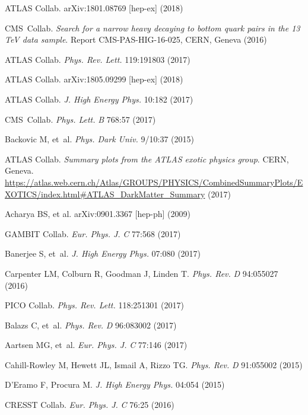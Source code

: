 \documentclass{ar-1col}
\begin{document}
{\begin{thebibliography}{175}
{ATLAS Collab}. arXiv:1801.08769 [hep-ex] (2018)

{CMS~Collab}. \textit{Search for a narrow heavy decaying to bottom quark pairs in the 13 TeV data sample}.
Report {CMS-PAS-HIG-16-025}, CERN, Geneva (2016)

{ATLAS Collab}. \textit{Phys. Rev. Lett.} 119:191803 (2017)

{ATLAS Collab.} arXiv:1805.09299 [hep-ex] (2018)

{ATLAS Collab}. \textit{J. High Energy Phys.} 10:182 (2017)

{CMS~Collab}. \textit{Phys. Lett.} \textit{B} 768:57 (2017)

Backovic M, et~al. \textit{Phys. Dark Univ.} 9/10:37 (2015)

ATLAS Collab. \textit{Summary plots from the ATLAS exotic
physics group}. CERN, Geneva. \url{https://atlas.web.cern.ch/Atlas/GROUPS/PHYSICS/CombinedSummaryPlots/EXOTICS/index.html#ATLAS_DarkMatter_Summary} (2017)

  Acharya BS, et al. arXiv:0901.3367 [hep-ph] (2009)

GAMBIT Collab. \textit{Eur. Phys. J.} \textit{C} 77:568 (2017)

Banerjee S, et~al. \textit{J. High Energy Phys.} 07:080 (2017)

Carpenter LM, Colburn R, Goodman J, Linden T. \textit{Phys. Rev.}
\textit{D} 94:055027 (2016)

PICO Collab. \textit{Phys. Rev. Lett.} 118:251301 (2017)

Balazs C, et~al. \textit{Phys. Rev.} \textit{D} 96:083002 (2017)

Aartsen MG, et~al. \textit{Eur. Phys. J.} \textit{C} 77:146 (2017)

Cahill-Rowley M, Hewett JL, Ismail A, Rizzo TG. \textit{Phys.
Rev.} \textit{D} 91:055002 (2015)

D'Eramo F, Procura M. \textit{J. High Energy Phys.} 04:054 (2015)

CRESST Collab. \textit{Eur. Phys. J.} \textit{C} 76:25 (2016)


\end{thebibliography}}
\end{document}
